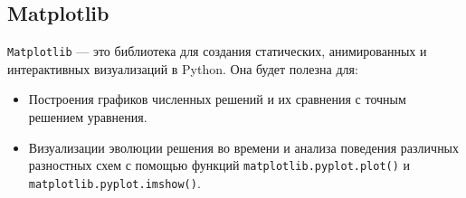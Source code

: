 \documentclass{report}
\begin{document}
\subsection*{Matplotlib}
\texttt{Matplotlib} — это библиотека для создания статических, анимированных и интерактивных визуализаций в Python. Она будет полезна для:
\begin{itemize}
    \item Построения графиков численных решений и их сравнения с точным решением уравнения.
    \item Визуализации эволюции решения во времени и анализа поведения различных разностных схем с помощью функций \texttt{matplotlib.pyplot.plot()} и \texttt{matplotlib.pyplot.imshow()}.
\end{itemize}
\end{document}
